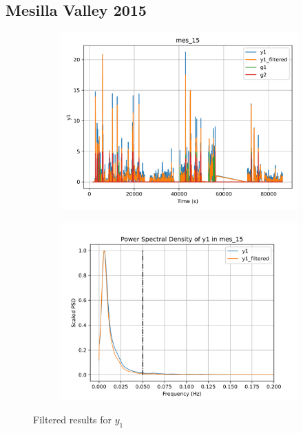 \graphicspath{{Appendices/apx1_signal_est}}
\subsection{Mesilla Valley 2015}

\begin{figure}[H]

\begin{minipage}{0.49\textwidth}
        \begin{figure}[H]
                \centering
                \includegraphics[width = \textwidth]{./figs/trk_filt/mes_15/y1.png}
        \end{figure}
\end{minipage}
\begin{minipage}{0.49\textwidth}
        \begin{figure}[H]
                \centering
                \includegraphics[width = \textwidth]{./figs/trk_filt/mes_15/y1_psd.png}
        \end{figure}
\end{minipage}
\caption{Filtered results for $y_1$}

\end{figure}


